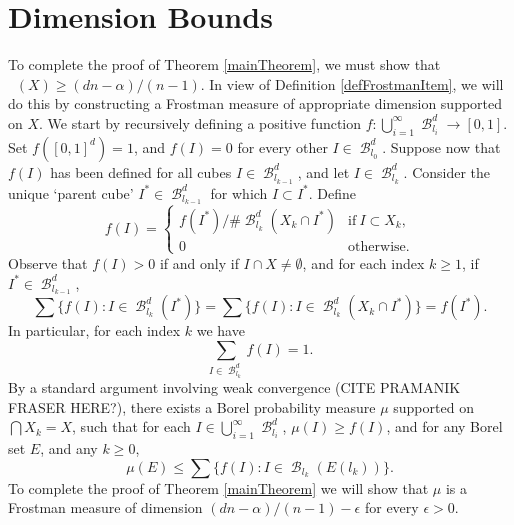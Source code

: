 \documentclass[dvipsnames,letterpaper,12pt]{article}
\numberwithin{equation}{section}
\theoremstyle{plain}
\theoremstyle{remark}
\DeclareMathOperator{\hausdim}{\dim_{\mathbf{H}}}
\DeclareMathOperator{\setcolon}{\colon}
\DeclareMathOperator{\B}{\mathcal{B}}
\begin{document}
\section{Dimension Bounds}\label{dimensionsection}

To complete the proof of Theorem \ref{mainTheorem}, we must show that $\hausdim(X) \geq (dn - \alpha)/(n - 1)$. In view of Definition \ref{defFrostmanItem}, we will do this by constructing a Frostman measure of appropriate dimension supported on $X$. We start by recursively defining a positive function $f: \bigcup_{i = 1}^\infty \B^d_{l_i} \to [0,1]$. Set $f([0,1]^d) = 1$, and $f(I) = 0$ for every other $I \in \B^d_{l_0}$. Suppose now that $f(I)$ has been defined for all cubes $I \in \B^d_{l_{k-1}}$, and let $I \in \B^d_{l_k}$. Consider the unique `parent cube' $I^* \in \B^d_{l_{k-1}}$ for which $I \subset I^*$. Define
%
\begin{equation} \label{muRecurse}
	f(I) = \begin{cases} {f(I^*)}/{\# \B^d_{l_k}(X_k \cap I^*)} & \textrm{if}\ I \subset X_k,\\
0 & \textrm{otherwise}. \end{cases}
\end{equation}
%
Observe that $f(I) > 0$ if and only if $I \cap X \neq \emptyset$, and for each index $k \geq 1$, if $I^* \in \B_{l_{k-1}}^d$, 
%
\begin{equation}\label{muBreakDown}
	\sum \{ f(I) \setcolon I \in \B_{l_k}^d(I^*) \} = \sum \{ f(I) \setcolon I \in \B_{l_k}^d(X_k\cap I^*) \} = f(I^*).
\end{equation}
%
In particular, for each index $k$ we have
%
\[ \sum_{I \in \B_{l_k}^d} f(I)=1. \]
By a standard argument involving weak convergence (CITE PRAMANIK FRASER HERE?), there exists a Borel probability measure $\mu$ supported on $\bigcap X_k = X$, such that for each $I \in \bigcup_{i = 1}^\infty \B^d_{l_i}$, $\mu(I) \geq f(I)$, and for any Borel set $E$, and any $k \geq 0$,
%
\begin{equation} \label{BorelConstructionProperty}
	\mu(E) \leq \sum \{ f(I) \setcolon I \in \B_{l_k}(E(l_k)) \}.
\end{equation}
%
To complete the proof of Theorem \ref{mainTheorem} we will show that $\mu$ is a Frostman measure of dimension $(dn - \alpha)/(n - 1)-\epsilon$ for every $\epsilon>0$. 
\end{document}
